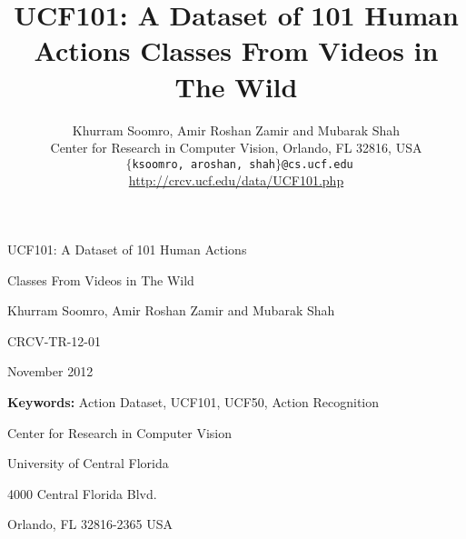 \documentclass[10pt,twocolumn,letterpaper]{article}
\begin{document}
\onecolumn


\vspace*{20 mm}

\begin{center}
{\huge UCF101: A Dataset of 101 Human Actions }
\end{center}

\begin{center}
{\huge Classes From Videos in The Wild}
\end{center}

\begin{center}
Khurram Soomro, Amir Roshan Zamir and Mubarak Shah
\end{center}

\begin{center}
CRCV-TR-12-01
\end{center}

\begin{center}
November 2012
\end{center}

\vspace{120 mm}


\begin{center}
\textbf{Keywords:}  Action Dataset, UCF101, UCF50, Action Recognition
\end{center}

\vspace{5 mm}

\begin{center}
Center for Research in Computer Vision
\end{center}

\begin{center}
University of Central Florida
\end{center}

\begin{center}
4000 Central Florida Blvd.
\end{center}

\begin{center}
Orlando, FL 32816-2365 USA
\end{center}

\twocolumn

\title{UCF101: A Dataset of 101 Human Actions Classes From Videos in The Wild}
\author{Khurram Soomro, Amir Roshan Zamir and Mubarak Shah\\
Center for Research in Computer Vision, Orlando, FL 32816, USA\\
{\tt\ $\{$ksoomro, aroshan, shah$\}$@cs.ucf.edu}\\
{\url{http://crcv.ucf.edu/data/UCF101.php}}
}
\end{document}
